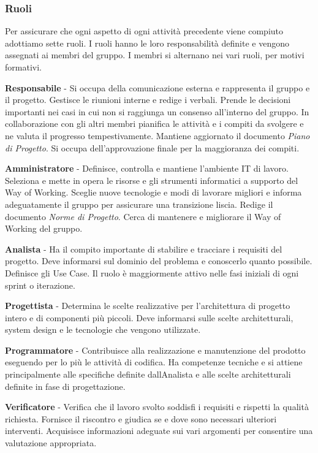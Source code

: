 \documentclass[12pt, a4paper]{article}
\begin{document}
\subsubsection{Ruoli}

Per assicurare che ogni aspetto di ogni attività precedente viene
compiuto adottiamo sette ruoli. I ruoli hanno le loro responsabilità
definite e vengono assegnati ai membri del gruppo. I membri si alternano
nei vari ruoli, per motivi formativi.

\textbf{Responsabile} - Si occupa della comunicazione esterna e
rappresenta il gruppo e il progetto. Gestisce le riunioni interne e
redige i verbali. Prende le decisioni importanti nei casi in cui non si
raggiunga un consenso all'interno del gruppo. In collaborazione con gli
altri membri pianifica le attività e i compiti da svolgere e ne valuta
il progresso tempestivamente. Mantiene aggiornato il documento
\emph{Piano di Progetto}. Si occupa dell'approvazione finale per la
maggioranza dei compiti.

\textbf{Amministratore} - Definisce, controlla e mantiene l'ambiente IT
di lavoro. Seleziona e mette in opera le risorse e gli strumenti
informatici a supporto del Way of Working. Sceglie nuove tecnologie e
modi di lavorare migliori e informa adeguatamente il gruppo per
assicurare una transizione liscia. Redige il documento \emph{Norme di
Progetto}. Cerca di mantenere e migliorare il Way of Working del gruppo.

\textbf{Analista} - Ha il compito importante di stabilire e tracciare i
requisiti del progetto. Deve informarsi sul dominio del problema e
conoscerlo quanto possibile. Definisce gli Use Case. Il ruolo è
maggiormente attivo nelle fasi iniziali di ogni sprint o iterazione.

\textbf{Progettista} - Determina le scelte realizzative per
l'architettura di progetto intero e di componenti più piccoli. Deve
informarsi sulle scelte architetturali, system design e le tecnologie
che vengono utilizzate.

\textbf{Programmatore} - Contribuisce alla realizzazione e manutenzione
del prodotto eseguendo per lo più le attività di codifica. Ha competenze
tecniche e si attiene principalmente alle specifiche definite
dall\textquotesingle Analista e alle scelte architetturali definite in
fase di progettazione.

\textbf{Verificatore} - Verifica che il lavoro svolto soddisfi i
requisiti e rispetti la qualità richiesta. Fornisce il riscontro e
giudica se e dove sono necessari ulteriori interventi. Acquisisce
informazioni adeguate sui vari argomenti per consentire una valutazione
appropriata.
\end{document}
